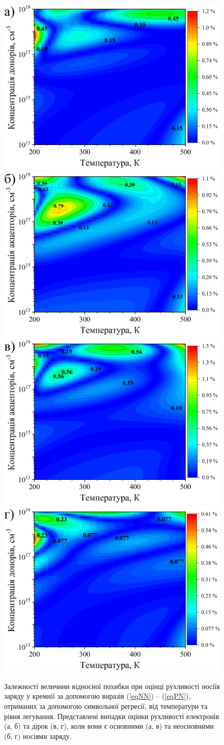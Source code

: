 \documentclass[12pt,a4paper,titlepage,oneside]{book}
\numberwithin{equation}{part}
\begin{document}
\begin{figure}
	\centering
     \includegraphics[width=0.49\linewidth]{Fig31a.png}
     \includegraphics[width=0.49\linewidth]{Fig31b.png}
     \includegraphics[width=0.49\linewidth]{Fig31c.png}
     \includegraphics[width=0.49\linewidth]{Fig31d.png}
	  \caption{Залежності величини відносної похибки при оцінці рухливості носіїв заряду 
у кремнії за допомогою виразів (\ref{eqNN}) -- (\ref{eqPN}),
отриманих за допомогою символьної регресії, від температури та рівня легування.
Представлені випадки оцінки рухливості електронів (а, б) та дірок (в, г), коли вони є
основними (а, в) та неосновними (б, г) носіями заряду.
}\label{figSR}
\end{figure}
\end{document}
